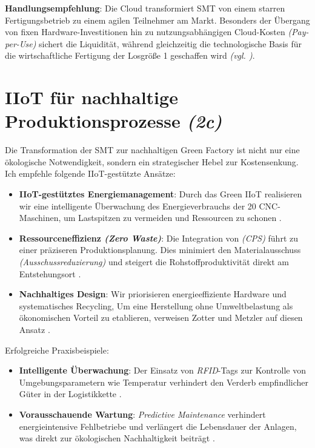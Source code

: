 \textbf{Handlungsempfehlung}: Die Cloud transformiert \acs{SMT} von einem starren Fertigungsbetrieb zu einem agilen Teilnehmer am Markt. Besonders der Übergang von fixen Hardware-Investitionen hin zu nutzungsabhängigen Cloud-Kosten \textit{(Pay-per-Use)} sichert die Liquidität, während gleichzeitig die technologische Basis für die wirtschaftliche Fertigung der Losgröße 1 geschaffen wird \textit{(\acs{vgl.} \cite[11]{1})}.


\section{\acs{IIoT} für nachhaltige Produktionsprozesse \textit{(2c)}}
\label{sec:2c}

Die Transformation der \acs{SMT} zur nachhaltigen \glqq Green Factory\grqq{} ist nicht nur eine ökologische Notwendigkeit, sondern ein strategischer Hebel zur Kostensenkung. Ich empfehle folgende \acs{IIoT}-gestützte Ansätze:

\begin{itemize}[leftmargin=*]
    \item \textbf{\acs{IIoT}-gestütztes Energiemanagement}: Durch das \glqq Green \acs{IIoT}\grqq{} realisieren wir eine intelligente Überwachung des Energieverbrauchs der 20 \acs{CNC}-Maschinen, um Lastspitzen zu vermeiden und Ressourcen zu schonen \cite[79]{2}.
    
    \item \textbf{Ressourceneffizienz \textit{(Zero Waste)}}: Die Integration von \textit{(\acs{CPS})} führt zu einer präziseren Produktionsplanung. Dies minimiert den Materialausschuss \textit{(Ausschussreduzierung)} und steigert die Rohstoffproduktivität direkt am Entstehungsort \cite[15]{1}.
    
    \item \textbf{Nachhaltiges Design}: Wir priorisieren energieeffiziente Hardware und systematisches Recycling, Um eine \glqq Herstellung ohne Umweltbelastung\grqq{} als ökonomischen Vorteil zu etablieren, verweisen Zotter und Metzler auf diesen Ansatz \cite[11]{2}.
\end{itemize}

Erfolgreiche Praxisbeispiele:

\begin{itemize}[leftmargin=*]
    \item \textbf{Intelligente Überwachung}: Der Einsatz von \textit{\acs{RFID}}-Tags zur Kontrolle von Umgebungsparametern wie Temperatur verhindert den Verderb empfindlicher Güter in der Logistikkette \cite[247]{1}.
    
    \item \textbf{Vorausschauende Wartung}: \textit{Predictive Maintenance} verhindert energieintensive Fehlbetriebe und verlängert die Lebensdauer der Anlagen, was direkt zur ökologischen Nachhaltigkeit beiträgt \cite[79]{2}.
\end{itemize}

